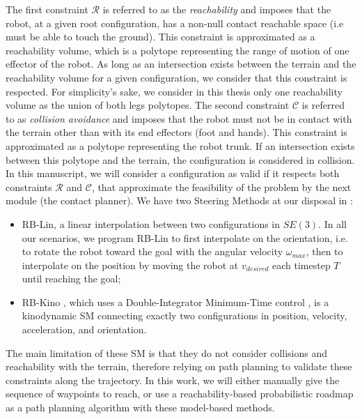 The first constraint $\mathcal{R}$ is referred to as the \textit{reachability} and imposes that the robot, at a given root configuration, has a non-null contact reachable space (i.e must be able to touch the ground). 
This constraint is approximated as a reachability volume, which is a polytope representing the range of motion of one effector of the robot.
As long as an intersection exists between the terrain and the reachability volume for a given configuration, we consider that this constraint is respected.
For simplicity's sake, we consider in this thesis only one reachability volume as the union of both legs polytopes.
The second constraint $\mathcal{C}$ is referred to as \textit{collision avoidance} and imposes that the robot must not be in contact with the terrain other than with its end effectors (foot and hands). This constraint is approximated as a polytope representing the robot trunk. If an intersection exists between this polytope and the terrain, the configuration is considered in collision.
In this manuscript, we will consider a configuration as valid if it respects both constraints $\mathcal{R}$ and $\mathcal{C}$, that approximate the feasibility of the problem by the next module (the contact planner).
We have two Steering Methods at our disposal in \cite{loco3d}:
\begin{itemize}
    \item RB-Lin, a linear interpolation between two configurations in $SE(3)$. In all our scenarios, we program RB-Lin to first interpolate on the orientation, i.e. to rotate the robot toward the goal with the angular velocity $\omega_{max}$, then to interpolate on the position by moving the robot at $v_{desired}$ each timestep $T$ until reaching the goal;
    \item RB-Kino \cite{kinodynamic_sm_2017}, which uses a Double-Integrator Minimum-Time control \cite{DIMT}, is a kinodynamic SM connecting exactly two configurations in position, velocity, acceleration, and orientation.
\end{itemize}
The main limitation of these SM is that they do not consider collisions and reachability with the terrain, therefore relying on path planning to validate these constraints along the trajectory.
In this work, we will either manually give the sequence of waypoints to reach, or use a reachability-based probabilistic roadmap \cite{RB-PRM} as a path planning algorithm with these model-based methods. 

